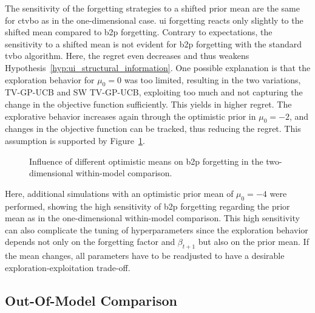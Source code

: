 The sensitivity of the forgetting strategies to a shifted prior mean are the same for \gls{ctvbo} as in the one-dimensional case. \gls{ui} forgetting reacts only slightly to the shifted mean compared to \gls{b2p} forgetting. Contrary to expectations, the sensitivity to a shifted mean is not evident for \gls{b2p} forgetting with the standard \gls{tvbo} algorithm. Here, the regret even decreases and thus weakens Hypothesis~\ref{hyp:ui_structural_information}. One possible explanation is that the exploration behavior for $\mu_0=0$ was too limited, resulting in the two variations, TV-GP-UCB and SW TV-GP-UCB, exploiting too much and not capturing the change in the objective function sufficiently. This yields in higher regret. The explorative behavior increases again through the optimistic prior in $\mu_0=-2$, and changes in the objective function can be tracked, thus reducing the regret. This assumption is supported by Figure~\ref{fig:WMC_cum_regret_different_mean}. 
\begin{figure}[h!]
    \centering
    
    \caption[Influence of different optimistic means on \gls{b2p} forgetting in the two-dimensional within-model comparison.]{Influence of different optimistic means on \gls{b2p} forgetting in the two-dimensional within-model comparison.}
    \label{fig:WMC_cum_regret_different_mean}
\end{figure}

Here, additional simulations with an optimistic prior mean of $\mu_0=-4$ were performed, showing the high sensitivity of \gls{b2p} forgetting regarding the prior mean as in the one-dimensional within-model comparison.
This high sensitivity can also complicate the tuning of hyperparameters since the exploration behavior depends not only on the forgetting factor and $\beta_{t+1}$ but also on the prior mean. If the mean changes, all parameters have to be readjusted to have a desirable exploration-exploitation trade-off.


\subsection{Out-Of-Model Comparison}
\label{sec:out_of_model}

